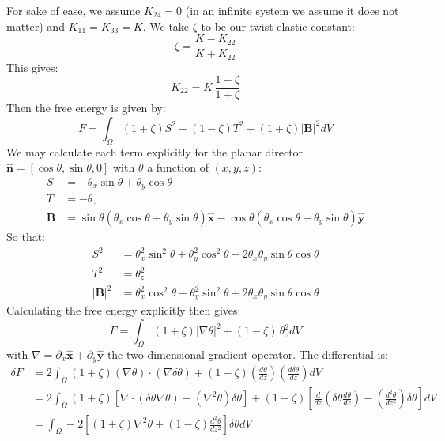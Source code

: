 \documentclass[reqno]{article}
\begin{document}
For sake of ease, we assume $K_{24} = 0$ (in an infinite system we assume it does not matter) and $K_{11} = K_{33} = K$.
We take $\zeta$ to be our twist elastic constant:
\begin{equation}
    \zeta
    =
    \frac{K - K_{22}}{K + K_{22}}
\end{equation}
This gives:
\begin{equation}
    K_{22}
    =
    K \, \frac{1 - \zeta}{1 + \zeta}
\end{equation}
Then the free energy is given by:
\begin{equation}
    F
    =
    \int_\Omega
    (1 + \zeta) S^2
    + (1 - \zeta) T^2
    + (1 + \zeta) \left| \mathbf{B} \right|^2
    dV
\end{equation}
We may calculate each term explicitly for the planar director $\mathbf{\hat{n}} = [\cos\theta, \sin\theta, 0]$ with $\theta$ a function of $(x, y, z)$:
\begin{align}
    S 
    &= 
    -\theta_x \sin\theta + \theta_y \cos\theta \\
    T 
    &= 
    - \theta_z \\
    \mathbf{B}
    &=
    \sin\theta \left( \theta_x \cos \theta + \theta_y \sin\theta \right) \mathbf{\hat{x}}
    - \cos\theta \left( \theta_x \cos \theta + \theta_y \sin\theta \right) \mathbf{\hat{y}}
\end{align}
So that:
\begin{align}
    S^2
    &=
    \theta_x^2 \sin^2\theta + \theta_y^2 \cos^2\theta - 2 \theta_x \theta_y \sin\theta \cos\theta \\
    T^2
    &=
    \theta_z^2 \\
    \left| \mathbf B \right|^2
    &=
    \theta_x^2 \cos^2\theta + \theta_y^2 \sin^2\theta + 2 \theta_x \theta_y \sin\theta \cos\theta
\end{align}
Calculating the free energy explicitly then gives:
\begin{equation}
    F
    =
    \int_\Omega
    (1 + \zeta) \left|\nabla \theta\right|^2
    + (1 - \zeta) \, \theta_z^2
    dV
\end{equation}
with $\nabla = \partial_x \mathbf{\hat{x}} + \partial_y \mathbf{\hat{y}}$ the two-dimensional gradient operator.
The differential is:
\begin{equation}
\begin{split}
    \delta F
    &=
    2
    \int_\Omega
    (1 + \zeta) \left(\nabla \theta\right) \cdot \left( \nabla \delta \theta \right)
    + (1 - \zeta) \left( \frac{d \theta}{dz} \right) \left(\frac{d \delta \theta}{d z} \right)
    dV \\
    &=
    2
    \int_\Omega
    (1 + \zeta) \left[
        \nabla \cdot \left(\delta \theta \nabla \theta\right)  
        - \left(\nabla^2 \theta\right) \delta \theta
    \right]
    + (1 - \zeta) \left[
        \frac{d}{dz} \left( \delta \theta \frac{d \theta}{dz} \right) 
        - \left( \frac{d^2 \theta}{dz^2} \right) \delta \theta
    \right]
    dV \\
    &=
    \int_\Omega
    - 2 \left[
        (1 + \zeta) \nabla^2 \theta 
        + (1 - \zeta) \frac{d^2 \theta}{dz^2}
    \right] \delta \theta
    dV
\end{split}
\end{equation}
\end{document}
